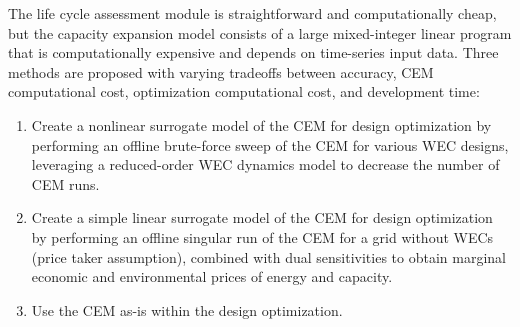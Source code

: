 The life cycle assessment module is straightforward and computationally cheap,
but the capacity expansion model consists of a large mixed-integer linear program that is computationally expensive and depends on time-series input data.
Three methods are proposed with varying tradeoffs between accuracy, CEM computational cost, optimization computational cost, and development time:
\begin{enumerate}
\item Create a nonlinear surrogate model of the CEM for design optimization by performing an offline brute-force sweep of the CEM for various WEC designs, leveraging a reduced-order WEC dynamics model to decrease the number of CEM runs.
\item Create a simple linear surrogate model of the CEM for design optimization by performing an offline singular run of the CEM for a grid without WECs (price taker assumption), combined with dual sensitivities to obtain marginal economic and environmental prices of energy and capacity.
\item Use the CEM as-is within the design optimization.
\end{enumerate}
